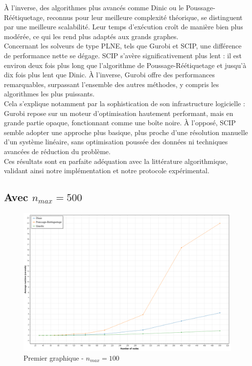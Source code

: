 \documentclass[a4paper]{article}
\begin{document}
À l'inverse, des algorithmes plus avancés comme Dinic ou le Poussage-Réétiquetage, reconnus pour leur meilleure complexité théorique, se distinguent par une meilleure scalabilité. Leur temps d'exécution croît de manière bien plus modérée, ce qui les rend plus adaptés aux grands graphes.\\

Concernant les solveurs de type PLNE, tels que Gurobi et SCIP, une différence de performance nette se dégage. SCIP s’avère significativement plus lent : il est environ deux fois plus long que l’algorithme de Poussage-Réétiquetage et jusqu’à dix fois plus lent que Dinic. À l’inverse, Gurobi offre des performances remarquables, surpassant l’ensemble des autres méthodes, y compris les algorithmes les plus puissants.\\

Cela s’explique notamment par la sophistication de son infrastructure logicielle : Gurobi repose sur un moteur d’optimisation hautement performant, mais en grande partie opaque, fonctionnant comme une \og{}boîte noire\fg{}. À l’opposé, SCIP semble adopter une approche plus basique, plus proche d’une résolution manuelle d’un système linéaire, sans optimisation poussée des données ni techniques avancées de réduction du problème.\\

Ces résultats sont en parfaite adéquation avec la littérature algorithmique, validant ainsi notre implémentation et notre protocole expérimental.

\subsection{Avec $n_{max} = 500$}

\begin{figure}[h]
    \centering
    \includegraphics[width=1\textwidth]{courbes/benchmark_global_average_500.png}
    \caption{Premier graphique - $n_{max} = 100$}
    \label{fig:example}
\end{figure}
\end{document}
